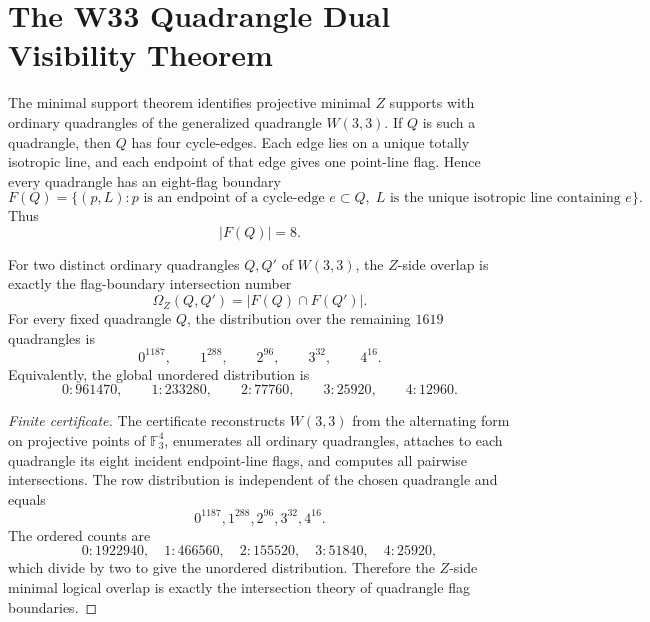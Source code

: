 
\section{The W33 Quadrangle Dual Visibility Theorem}
\label{sec:w33-quadrangle-dual-visibility}

The minimal support theorem identifies projective minimal $Z$ supports with ordinary
quadrangles of the generalized quadrangle $W(3,3)$.  If $Q$ is such a quadrangle,
then $Q$ has four cycle-edges.  Each edge lies on a unique totally isotropic line,
and each endpoint of that edge gives one point-line flag.  Hence every quadrangle
has an eight-flag boundary
\[
        F(Q)=\{(p,L):p\text{ is an endpoint of a cycle-edge }e\subset Q,
        \; L\text{ is the unique isotropic line containing }e\}.
\]
Thus
\[
        |F(Q)|=8.
\]

\begin{theorem}
For two distinct ordinary quadrangles $Q,Q'$ of $W(3,3)$, the $Z$-side overlap is
exactly the flag-boundary intersection number
\[
        \Omega_Z(Q,Q')=|F(Q)\cap F(Q')|.
\]
For every fixed quadrangle $Q$, the distribution over the remaining $1619$ quadrangles is
\[
        0^{1187},\qquad 1^{288},\qquad 2^{96},\qquad 3^{32},\qquad 4^{16}.
\]
Equivalently, the global unordered distribution is
\[
        0:961470,
        \qquad
        1:233280,
        \qquad
        2:77760,
        \qquad
        3:25920,
        \qquad
        4:12960.
\]
\end{theorem}

\begin{proof}[Finite certificate]
The certificate reconstructs $W(3,3)$ from the alternating form on projective points
of $\mathbb F_3^4$, enumerates all ordinary quadrangles, attaches to each quadrangle
its eight incident endpoint-line flags, and computes all pairwise intersections.
The row distribution is independent of the chosen quadrangle and equals
\[
        0^{1187},1^{288},2^{96},3^{32},4^{16}.
\]
The ordered counts are
\[
        0:1922940,
        \quad
        1:466560,
        \quad
        2:155520,
        \quad
        3:51840,
        \quad
        4:25920,
\]
which divide by two to give the unordered distribution.  Therefore the $Z$-side
minimal logical overlap is exactly the intersection theory of quadrangle flag
boundaries.
\end{proof}

